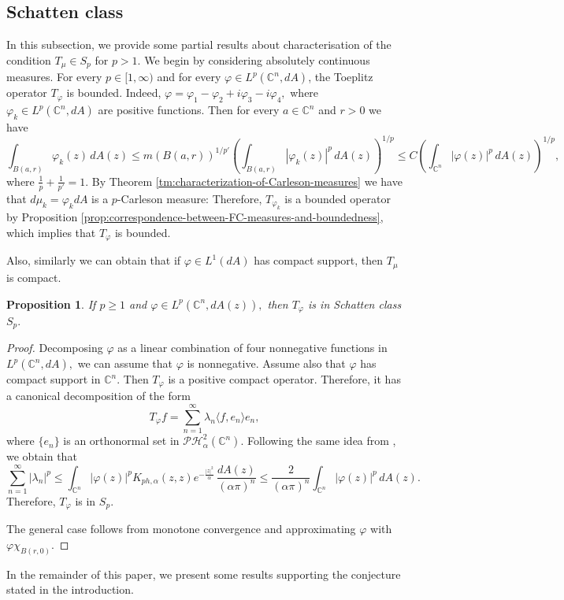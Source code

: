 \documentclass[10pt,leqno]{amsart}
\newtheorem{proposition}[theorem]{Proposition}
\theoremstyle{remark}
\numberwithin{equation}{section}
\newcommand{\hph}{\mathcal{PH}_\alpha^2(\mathbb{C}^n)}%
\newcommand{\Kph}{K_{ph,\alpha}}%
\begin{document}
\subsection{Schatten class}
In this subsection, we provide some partial results about characterisation of the condition $T_\mu \in S_p$ for $p>1.$ We begin by considering absolutely continuous measures.
For every $p \in [1,\infty)$ and for every $\varphi \in L^p(\mathbb{C}^{n},dA)$, the Toeplitz operator $T_\varphi$ is bounded. Indeed, $\varphi = \varphi_1 -\varphi_2 +i \varphi_3 -i \varphi_4,$ where $\varphi_k \in L^p(\mathbb{C}^{n},dA)$ are positive functions. Then for every $a  \in \mathbb{C}^{n}$ and $r>0$ we have
\[
	\int_{B(a,r)}^{} \varphi_k(z) \, dA(z) \leq m(B(a,r))^{1/p'}  \left( \int_{B(a,r)}^{}|\varphi_k(z)|^{p}\, dA(z) \right) ^{1/p}  \leq C  \left( \int_{\mathbb{C}^{n}}^{}|\varphi(z)|^{p}\, dA(z) \right) ^{1/p} ,
\]
where $\frac{1}{p}+\frac{1}{p'}=1$. By Theorem \ref{tm:characterization-of-Carleson-measures} we have that $d\mu_k = \varphi_k dA$ is a $p$-Carleson measure: Therefore, $T_{\varphi_k}$ is a bounded operator by Proposition \ref{prop:correspondence-between-FC-measures-and-boundedness}, which implies that $T_\varphi$ is bounded.

Also, similarly we can obtain that if $\varphi \in L^1(dA)$ has compact support, then $T_\mu$ is compact.
\begin{proposition}\label{prop:toeplitz-function-operator-shatten-class}
	If $p \geq  1$ and $\varphi \in L^p(\mathbb{C}^{n},dA(z)),$ then $T_\varphi$ is in Schatten class $S_p.$
\end{proposition}
\begin{proof}
	Decomposing $\varphi$ as a linear combination of four nonnegative functions in $L^p(\mathbb{C}^{n},dA),$ we can assume that $\varphi$ is nonnegative. Assume also that $\varphi$ has compact support in $\mathbb{C}^{n}.$ Then $T_\varphi$ is a positive compact operator. Therefore, it has a canonical decomposition of the form
	\[
		T_\varphi f = \sum_{n=1}^{\infty} \lambda_n \langle f,e_n \rangle e_n,
	\]
	where $\{e_n\}$ is an orthonormal set in $\hph.$
	Following the same idea from \cite[Prop. 7.11]{zhuOperatorTheoryFunction2007}, we obtain that
	\[
		\sum_{n=1}^{\infty} |\lambda_n|^{p} \leq  \int_{\mathbb{C}^{n}}^{}|\varphi(z)|^p \Kph (z,z) e^{-\frac{|z|^2}{\alpha}}\, \frac{dA(z)}{\left( \alpha \pi  \right) ^{n}} \leq  \frac{2}{\left( \alpha \pi  \right) ^{n}} \int_{\mathbb{C}^{n}}^{}|\varphi(z)|^{p}\, dA(z).
	\]
	Therefore, $T_\varphi$ is in $S_p.$

	The general case follows from monotone convergence and approximating $\varphi$ with $\varphi \chi_{B(r,0)}.$
\end{proof}
In the remainder of this paper, we present some results supporting the conjecture stated in the introduction.
\end{document}
